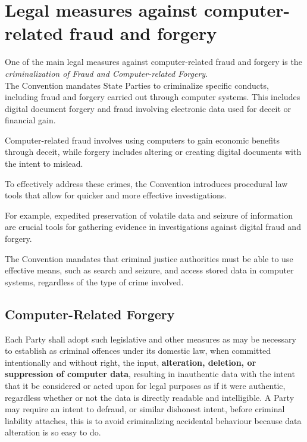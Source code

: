 \section{Legal measures against computer-related fraud and forgery}
One of the main legal measures against computer-related fraud and 
forgery is the \textit{criminalization of Fraud and Computer-related
Forgery}.\\
The Convention mandates State Parties to criminalize specific
conducts, including fraud and forgery carried out through computer
systems. This includes digital document forgery and fraud involving
electronic data used for deceit or financial gain. 

\begin{boxH}
  Computer-related fraud involves using computers to gain economic
  benefits through deceit, while forgery includes altering or creating
  digital documents with the intent to mislead.
\end{boxH}

To effectively address these crimes, the Convention introduces
procedural law tools that allow for quicker and more effective
investigations.

For example, expedited preservation of volatile data and seizure of
information are crucial tools for gathering evidence in investigations
against digital fraud and forgery.

The Convention mandates that criminal justice authorities must be
able to use effective means, such as search and seizure, and access
stored data in computer systems, regardless of the type of crime
involved.
\subsection{Computer-Related Forgery}
Each Party shall adopt such legislative and other measures as may be
necessary to establish as criminal offences under its domestic law,
when committed intentionally and without right, the input,
\textbf{alteration, deletion, or suppression of computer data},
resulting in inauthentic data with the intent that it be considered or
acted upon for legal purposes as if it were authentic, regardless
whether or not the data is directly readable and intelligible. A Party
may require an intent to defraud, or similar dishonest intent, before
criminal liability attaches, this is to avoid criminalizing 
accidental behaviour because data alteration is so easy to do.
